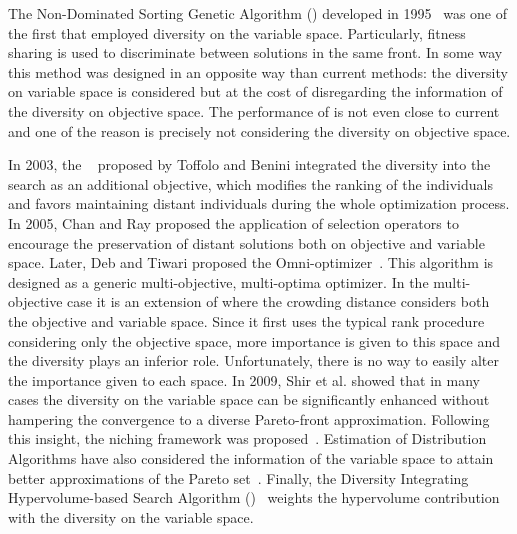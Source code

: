 The Non-Dominated Sorting Genetic Algorithm (\NSGA{}) developed in 1995~\cite{srinivas1994muiltiobjective} 
was one of the first \MOEAS{} that employed diversity on the variable space.
%
Particularly, fitness sharing is used to discriminate between solutions in the same front.
%
%
In some way this method was designed in an opposite way than current methods: the diversity
on variable space is considered but at the cost of disregarding the information of the diversity
on objective space.
%
The performance of \NSGA{} is not even close to current \MOEAS{} and one 
of the reason is precisely not considering the diversity on objective space.

In 2003, the \GDEA{}~\cite{toffolo2003genetic} proposed by Toffolo and Benini integrated the diversity into the search 
as an additional objective, which modifies the ranking of the individuals and favors maintaining distant individuals
during the whole optimization process.
%
In 2005, Chan and Ray \cite{chan2005evolutionary} proposed the application of selection operators to
encourage the preservation of distant solutions both on objective and variable space.
%
%
Later, Deb and Tiwari proposed the Omni-optimizer~\cite{deb2008omni}.
%
This algorithm is designed as a generic multi-objective, multi-optima optimizer. %
%
In the multi-objective case it is an extension of \NSGAII{} where the crowding distance considers both the objective and variable space.
%
Since it first uses the typical rank procedure considering only the objective space, more importance is given to this space 
and the diversity plays an inferior role.
%
Unfortunately, there is no way to easily alter the importance given to each space.
%
In 2009, Shir et al. showed that in many cases the diversity on the variable space can be significantly enhanced without hampering 
the convergence to a diverse Pareto-front approximation.
%
Following this insight, the \CMAES{} niching framework was proposed~\cite{shir2009enhancing}.
%
Estimation of Distribution Algorithms have also considered the information of the variable space
to attain better approximations of the Pareto set~\cite{zhou2009approximating}.
%
Finally, the Diversity Integrating Hypervolume-based Search Algorithm (\DIVA{})~\cite{ulrich2010integrating}
weights the hypervolume contribution with the diversity on the variable space.

